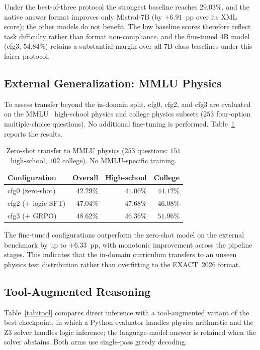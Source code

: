 \documentclass[preprint,12pt]{elsarticle}
\newcommand{\dataset}{EXACT~2026}
\begin{document}
Under the best-of-three protocol the strongest baseline reaches $29.03\%$,
and the native answer format improves only Mistral-7B (by $+6.91$~pp over
its XML score); the other models do not benefit. The low baseline scores
therefore reflect task difficulty rather than format non-compliance, and
the fine-tuned 4B model (cfg3, $54.84\%$) retains a substantial margin over
all 7B-class baselines under this fairer protocol.

\subsection{External Generalization: MMLU Physics}
\label{sec:mmlu}
To assess transfer beyond the in-domain split, cfg0, cfg2, and cfg3 are
evaluated on the MMLU~\cite{Hendrycks2021} high-school physics and college
physics subsets ($253$ four-option multiple-choice questions). No additional
fine-tuning is performed. Table~\ref{tab:mmlu} reports the results.

\begin{table}[t]
\centering
\caption{Zero-shot transfer to MMLU physics ($253$ questions:
         $151$ high-school, $102$ college). No MMLU-specific training.}
\label{tab:mmlu}
\begin{tabular}{lrrr}
\toprule
Configuration & Overall & High-school & College \\
\midrule
cfg0 (zero-shot)     & $42.29\%$ & $41.06\%$ & $44.12\%$ \\
cfg2 ($+$ logic SFT) & $47.04\%$ & $47.68\%$ & $46.08\%$ \\
cfg3 ($+$ GRPO)      & $\mathbf{48.62\%}$ & $46.36\%$ & $51.96\%$ \\
\bottomrule
\end{tabular}
\end{table}

The fine-tuned configurations outperform the zero-shot model on the external
benchmark by up to $+6.33$~pp, with monotonic improvement across the pipeline
stages. This indicates that the in-domain curriculum transfers to an unseen
physics test distribution rather than overfitting to the \dataset{} format.

\subsection{Tool-Augmented Reasoning}
\label{sec:tool}
Table~\ref{tab:tool} compares direct inference with a tool-augmented variant
of the best checkpoint, in which a Python evaluator handles physics
arithmetic and the Z3 solver handles logic inference; the language-model
answer is retained when the solver abstains. Both arms use single-pass
greedy decoding.
\end{document}
